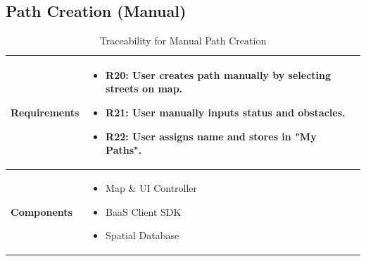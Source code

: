 \subsection{Path Creation (Manual)}
\begin{table}[H]
    \centering
    \renewcommand{\arraystretch}{1.5}
    \begin{tabular}{|p{}|p{}|}
        \hline
        \textbf{Requirements} & 
        \begin{itemize}[nosep, leftmargin=*, label={}, before=\vspace{-0.6\baselineskip}, after=\strut]
            \item \textbf{R20:} User creates path manually by selecting streets on map.
            \item \textbf{R21:} User manually inputs status and obstacles.
            \item \textbf{R22:} User assigns name and stores in "My Paths".
        \end{itemize} \\
        \hline
        \textbf{Components} & 
        \begin{itemize}[nosep, leftmargin=*, before=\vspace{-0.6\baselineskip}, after=\strut]
            \item Map \& UI Controller
            \item BaaS Client SDK
            \item Spatial Database
        \end{itemize} \\
        \hline
    \end{tabular}
    \caption{Traceability for Manual Path Creation}
\end{table}

